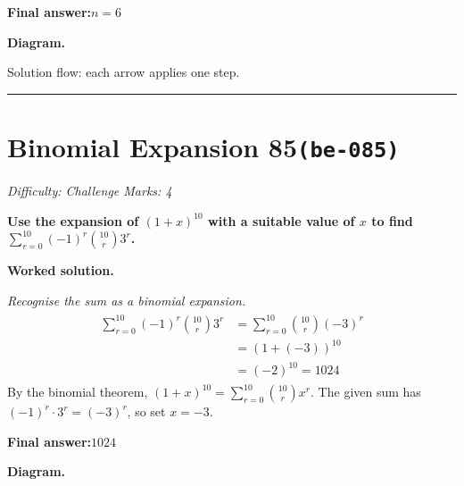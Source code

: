 \documentclass[11pt]{article}
\newcommand{\question}[1]{\par\medskip\noindent\textbf{#1}\par}
\begin{document}
\begin{answerbox}
\textbf{Final answer:}\quad \(\displaystyle n = 6\)
\end{answerbox}
\textbf{Diagram.}

\begin{center}
\end{center}
\small Solution flow: each arrow applies one step.\normalsize

\medskip\hrule

\section*{Binomial Expansion 85\quad\small\texttt{(be-085)}}
\textit{Difficulty: Challenge \quad\textbar\quad Marks: 4}

\question{Use the expansion of \( (1 + x)^{10} \) with a suitable value of \( x \) to find \( \sum_{r=0}^{10} (-1)^r \binom{10}{r} 3^r \).}

\textbf{Worked solution.}

\textit{Recognise the sum as a binomial expansion.}
\[\begin{gathered}
\begin{aligned} \sum_{r=0}^{10} (-1)^r \binom{10}{r} 3^r &= \sum_{r=0}^{10} \binom{10}{r} (-3)^r \\ &= (1 + (-3))^{10} \\ &= (-2)^{10} = 1024 \end{aligned}
\end{gathered}\]
By the binomial theorem, \((1+x)^{10} = \sum_{r=0}^{10} \binom{10}{r} x^r\). The given sum has \((-1)^r \cdot 3^r = (-3)^r\), so set \(x = -3\).

\begin{answerbox}
\textbf{Final answer:}\quad \(\displaystyle 1024\)
\end{answerbox}
\textbf{Diagram.}
\end{document}
